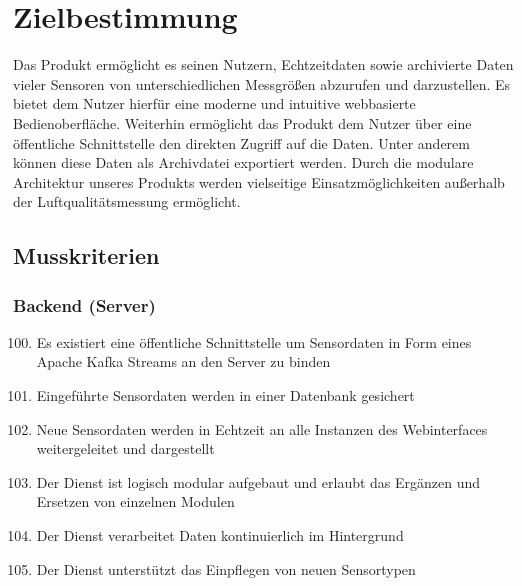 \chapter{Zielbestimmung}
Das Produkt ermöglicht es seinen Nutzern, Echtzeitdaten sowie archivierte Daten vieler Sensoren von unterschiedlichen Messgrößen abzurufen und darzustellen. Es bietet dem Nutzer hierfür eine moderne und intuitive webbasierte Bedienoberfläche. Weiterhin ermöglicht das Produkt dem Nutzer über eine öffentliche Schnittstelle den direkten Zugriff auf die Daten. Unter anderem können diese Daten als Archivdatei exportiert werden. Durch die modulare Architektur unseres Produkts werden vielseitige Einsatzmöglichkeiten außerhalb der Luftqualitätsmessung ermöglicht.
\section{Musskriterien}
\subsection{Backend (Server)}
\begin{enumerate}[label=\textbf{MK\arabic{enumi}0}]
	\setcounter{enumi}{99}
	\item Es existiert eine öffentliche Schnittstelle um Sensordaten in Form eines Apache Kafka Streams an den Server zu binden
	\item Eingeführte Sensordaten werden in einer Datenbank gesichert
	\item Neue Sensordaten werden in Echtzeit an alle Instanzen des Webinterfaces weitergeleitet und dargestellt
	\item Der Dienst ist logisch modular aufgebaut und erlaubt das Ergänzen und Ersetzen von einzelnen Modulen
	\item Der Dienst verarbeitet Daten kontinuierlich im Hintergrund
	\item Der Dienst unterstützt das Einpflegen von neuen Sensortypen
\end{enumerate}
